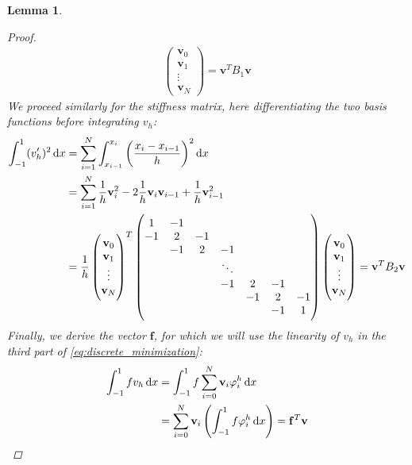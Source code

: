 \documentclass[headsepline,footsepline,footinclude=false,oneside,fontsize=11pt,paper=a4,listof=totoc,bibliography=totoc]{scrbook} %
\newtheorem{lemma}{Lemma}
\begin{document}
\begin{lemma}
\begin{proof}
\begin{align*}
\begin{pmatrix}
				\mathbf{v}_0 \\					
				\mathbf{v}_1 \\
				\vdots \\
				\mathbf{v}_N 
				\end{pmatrix} = \mathbf{v}^T B_1 \mathbf{v}
			\end{align*}
			We proceed similarly for the stiffness matrix, here differentiating the two basis functions before integrating $v_h$:
			\begin{align*}
			\int_{-1}^1 (v_h')^2 \dif x &= \sum_{i=1}^{N} \int_{x_{i-1}}^{x_i} \left(\frac{x_i-x_{i-1}}{h}\right)^2 \dif x \\
			&= \sum_{i=1}^{N} \frac{1}{h} \mathbf{v}_i^2 - 2\frac{1}{h} \mathbf{v}_i\mathbf{v}_{i-1} + \frac{1}{h}\mathbf{v}_{i-1}^2 \\
			&= \frac{1}{h} 
			\begin{pmatrix}
			\mathbf{v}_0 \\					
			\mathbf{v}_1 \\
			\vdots \\
			\mathbf{v}_N 
			\end{pmatrix}^T
			\begin{pmatrix}
			1& -1 & & & & & \\
			-1& 2& -1 & & & & \\
			& -1& 2& -1 & & & \\
			& & & \ddots & & & \\
			& & & -1& 2& -1 & \\
			& & & & -1& 2& -1 \\
			& & & & & -1& 1
			\end{pmatrix}
			\begin{pmatrix}
			\mathbf{v}_0 \\					
			\mathbf{v}_1 \\
			\vdots \\
			\mathbf{v}_N 
			\end{pmatrix} = \mathbf{v}^T B_2 \mathbf{v}
			\end{align*}
			\clearpage
			Finally, we derive the vector $\mathbf{f}$, for which we will use the linearity of $v_h$ in the third part of \eqref{eq:discrete_minimization}:
			\begin{align*}
				\int_{-1}^1 fv_h \dif x &= \int_{-1}^1 f \sum_{i=0}^{N} \mathbf{v}_i \varphi_i^h \dif x \\
				&= \sum_{i=0}^{N} \mathbf{v}_i \left(\int_{-1}^1 f\varphi_i^h\dif x\right) = \mathbf{f}^T \mathbf{v}
			\end{align*}
		\end{proof}
\end{lemma}
\end{document}
